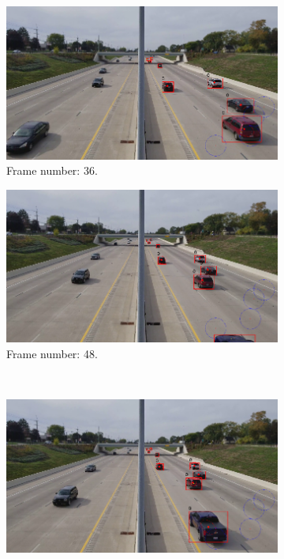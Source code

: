 \begin{figure}[H]
    \centering
    \begin{subfigure}{0.48\textwidth}
        \centering
        \includegraphics[width=\linewidth]{../../../experiments/E1/V1/DINO/36}
        \caption{Frame number: 36.}
        \label{fig:E1-V1-S3:01}
    \end{subfigure}
    \begin{subfigure}{0.48\textwidth}
        \centering
        \includegraphics[width=\linewidth]{../../../experiments/E1/V1/DINO/48}
        \caption{Frame number: 48.}
        \label{fig:E1-V1-S3:02}
    \end{subfigure}
    \\
    \begin{subfigure}{0.48\textwidth}
        \centering
        \includegraphics[width=\linewidth]{../../../experiments/E1/V1/DINO/54}

\end{subfigure}
\end{figure}
